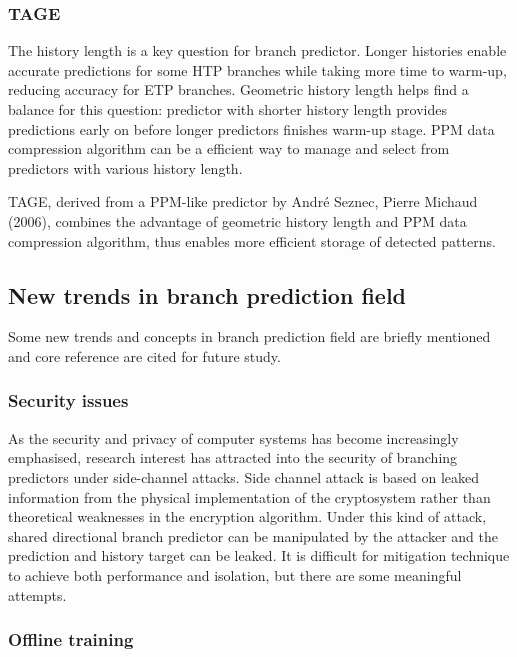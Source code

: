 \newpage
\subsubsection{TAGE}

The history length is a key question for branch predictor. Longer histories enable accurate predictions for some HTP branches while taking more time to warm-up, reducing accuracy for ETP branches. Geometric history length\cite{seznec_analysis_2005} helps find a balance for this question: predictor with shorter history length provides predictions early on before longer predictors finishes warm-up stage. PPM data compression algorithm can be a efficient way to manage and select from predictors with various history length.
\par\hspace*{\fill}\par
TAGE, derived from a PPM-like predictor \cite{michaud_ppm-like_2005} by André Seznec, Pierre Michaud (2006), combines the advantage of geometric history length and PPM data compression algorithm, thus enables more efficient storage of detected patterns.


\subsection{New trends in branch prediction field}

Some new trends and concepts in branch prediction field are briefly mentioned and core reference are cited for future study.

\subsubsection{Security issues}

As the security and privacy of computer systems has become increasingly emphasised, research interest has attracted into the security of branching predictors under side-channel attacks. Side channel attack is based on leaked information from the physical implementation of the cryptosystem rather than theoretical weaknesses in the encryption algorithm. Under this kind of attack, shared directional branch predictor can be manipulated by the attacker and the prediction and  history target can be leaked\cite{evtyushkin_branchscope_2018}. It is difficult for mitigation technique to achieve both performance and isolation, but there are some meaningful attempts\cite{vougioukas_brb_2019}.


\subsubsection{Offline training}

